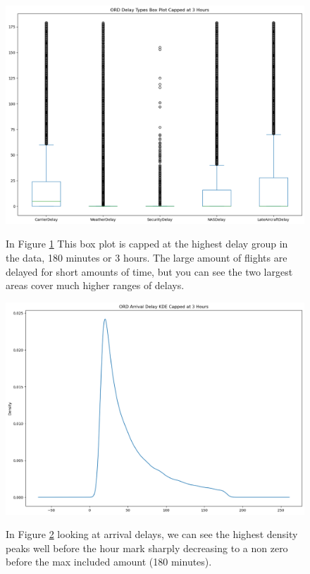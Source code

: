 \documentclass[a4paper,12pt]{article}
\begin{document}
\begin{figure}
    \centering
    \includegraphics*[scale=.40]{../../img/3h_box.png}
    \caption[]{}
    \label{fig:3hbox}
    In Figure \ref{fig:3hbox} This box plot is capped at the highest delay group in the data, 180 minutes or 3 hours. The large amount of flights are delayed for short amounts of time, but you can see the 
    two largest areas cover much higher ranges of delays.    
\end{figure}

\begin{figure}
    \centering
    \includegraphics*[scale=.45]{../../img/3h_kde.png}
    \caption[]{}
    \label{fig:3hkde}
    In Figure \ref{fig:3hkde} looking at arrival delays, we can see the highest density peaks well before the hour mark sharply decreasing to a non zero
    before the max included amount (180 minutes).
\end{figure}
\end{document}
